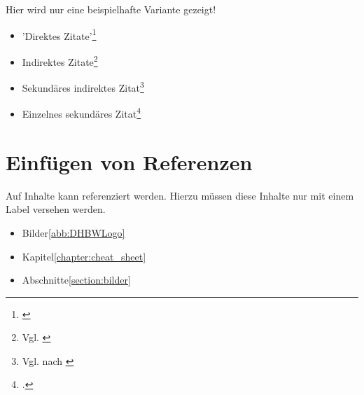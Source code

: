 Hier wird nur eine beispielhafte Variante gezeigt!

\begin{itemize}
    \item 'Direktes Zitate'\footnote{\cite[S. 114ff.]{Mayring2002}}
    \item Indirektes Zitate\footnote{Vgl. \cite[S. 114ff.]{Mayring2002}}
    \item Sekundäres indirektes Zitat\footnote{Vgl. \cite[S. 114ff.]{Mayring2002} nach \cite{Endres}}
    \item Einzelnes sekundäres Zitat\footcite[Vgl.][S.1]{W3SchoolUnderscore}
\end{itemize}

\section{Einfügen von Referenzen}\label{section:referenzen}

Auf Inhalte kann referenziert werden. Hierzu müssen diese Inhalte nur mit einem Label versehen werden.

\begin{itemize}
    \item Bilder\ref{abb:DHBWLogo}
    \item Kapitel\ref{chapter:cheat_sheet}
    \item Abschnitte\ref{section:bilder}
\end{itemize}

